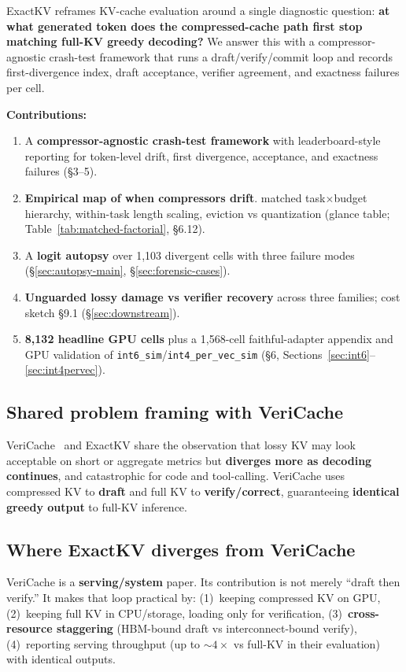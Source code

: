 \documentclass[11pt]{article}
\begin{document}
\begin{sloppypar}
ExactKV reframes KV-cache evaluation around a single diagnostic question:
\textbf{at what generated token does the compressed-cache path first stop
matching full-KV greedy decoding?} We answer this with a compressor-agnostic
crash-test framework that runs a draft/verify/commit loop and records
first-divergence index, draft acceptance, verifier agreement, and exactness
failures per cell.
\end{sloppypar}

\textbf{Contributions:}
\begin{enumerate}
\item A \textbf{compressor-agnostic crash-test framework} with leaderboard-style
  reporting for token-level drift, first divergence, acceptance, and exactness
  failures (\S3--5).
\item \textbf{Empirical map of when compressors drift}. matched task$\times$budget
  hierarchy, within-task length scaling, eviction vs quantization (glance table;
  Table~\ref{tab:matched-factorial}, \S6.12).
\item A \textbf{logit autopsy} over 1{,}103 divergent cells with three failure modes
  (\S\ref{sec:autopsy-main}, \S\ref{sec:forensic-cases}).
\item \textbf{Unguarded lossy damage vs verifier recovery} across three families;
  cost sketch \S9.1 (\S\ref{sec:downstream}).
\item \textbf{8,132 headline GPU cells} plus a 1{,}568-cell faithful-adapter appendix
  and GPU validation of \texttt{int6\_sim}/\texttt{int4\_per\_vec\_sim}
  (\S6, Sections~\ref{sec:int6}--\ref{sec:int4pervec}).
\end{enumerate}

\subsection{Shared problem framing with VeriCache}
VeriCache~\citep{vericache2026} and ExactKV share the observation that lossy KV
may look acceptable on short or aggregate metrics but \textbf{diverges more as
decoding continues}, and catastrophic for code and tool-calling. VeriCache uses
compressed KV to \textbf{draft} and full KV to \textbf{verify/correct}, guaranteeing
\textbf{identical greedy output} to full-KV inference.

\subsection{Where ExactKV diverges from VeriCache}
VeriCache is a \textbf{serving/system} paper. Its contribution is not merely
``draft then verify.'' It makes that loop practical by: (1)~keeping compressed KV
on GPU, (2)~keeping full KV in CPU/storage, loading only for verification,
(3)~\textbf{cross-resource staggering} (HBM-bound draft vs interconnect-bound
verify), (4)~reporting serving throughput (up to ${\sim}4\times$ vs full-KV in
their evaluation) with identical outputs.
\end{document}
